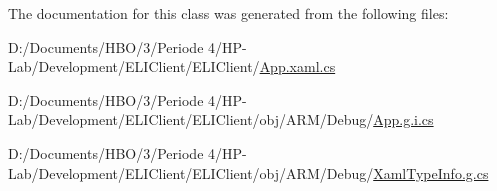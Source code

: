 The documentation for this class was generated from the following files\+:\begin{DoxyCompactItemize}
\item 
D\+:/\+Documents/\+H\+B\+O/3/\+Periode 4/\+H\+P-\/\+Lab/\+Development/\+E\+L\+I\+Client/\+E\+L\+I\+Client/\hyperlink{_e_l_i_client_2_e_l_i_client_2_app_8xaml_8cs}{App.\+xaml.\+cs}\item 
D\+:/\+Documents/\+H\+B\+O/3/\+Periode 4/\+H\+P-\/\+Lab/\+Development/\+E\+L\+I\+Client/\+E\+L\+I\+Client/obj/\+A\+R\+M/\+Debug/\hyperlink{_e_l_i_client_2_e_l_i_client_2obj_2_a_r_m_2_debug_2_app_8g_8i_8cs}{App.\+g.\+i.\+cs}\item 
D\+:/\+Documents/\+H\+B\+O/3/\+Periode 4/\+H\+P-\/\+Lab/\+Development/\+E\+L\+I\+Client/\+E\+L\+I\+Client/obj/\+A\+R\+M/\+Debug/\hyperlink{_e_l_i_client_2_e_l_i_client_2obj_2_a_r_m_2_debug_2_xaml_type_info_8g_8cs}{Xaml\+Type\+Info.\+g.\+cs}\end{DoxyCompactItemize}
